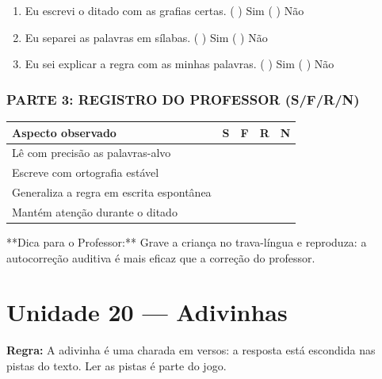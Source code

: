\begin{exercicio}
\begin{enumerate}[label=\alph*)]
  \item Eu escrevi o ditado com as grafias certas.  \quad ( ) Sim   ( ) Não

  \item Eu separei as palavras em sílabas.  \quad ( ) Sim   ( ) Não

  \item Eu sei explicar a regra com as minhas palavras.  \quad ( ) Sim   ( ) Não

\end{enumerate}

\subsection*{PARTE 3: REGISTRO DO PROFESSOR (S/F/R/N)}

\begin{center}
\renewcommand{\arraystretch}{1.4}
\begin{tabular}{@{}p{9cm}cccc@{}}
\toprule
Aspecto observado & S & F & R & N \\
\midrule
Lê com precisão as palavras-alvo & & & & \\
Escreve com ortografia estável & & & & \\
Generaliza a regra em escrita espontânea & & & & \\
Mantém atenção durante o ditado & & & & \\
\bottomrule\end{tabular}\end{center}

\end{exercicio}

\begin{dica}
**Dica para o Professor:** Grave a criança no trava-língua e reproduza: a autocorreção auditiva é mais eficaz que a correção do professor.
\end{dica}


\chapter{Unidade 20 --- Adivinhas}


\textbf{Regra:} A adivinha é uma charada em versos: a resposta está escondida nas pistas do texto. Ler as pistas é parte do jogo.

